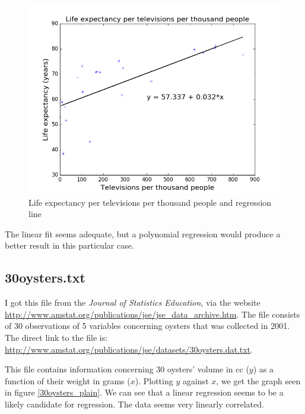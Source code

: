 \documentclass[]{article}
\begin{document}
\begin{figure}[h]
\centering
\includegraphics{TV_reg.png}
\caption{Life expectancy per televisions per thousand people and regression line}
\label{TV_reg}
\end{figure}

The linear fit seems adequate, but a polynomial regression would produce a better result in this particular case.

\newpage
\subsection*{30oysters.txt}
I got this file from the \textit{Journal of Statistics Education}, via the website \url{http://www.amstat.org/publications/jse/jse_data_archive.htm}. The file consists of 30 observations of 5 variables concerning oysters that was collected in 2001. The direct link to the file is: \url{http://www.amstat.org/publications/jse/datasets/30oysters.dat.txt}.

This file contains information concerning 30 oysters' volume in cc ($y$) as a function of their weight in grams ($x$). Plotting $y$ against $x$, we get the graph seen in figure \ref{30oysters_plain}. We can see that a linear regression seems to be a likely candidate for regression. The data seems very linearly correlated.
\end{document}
